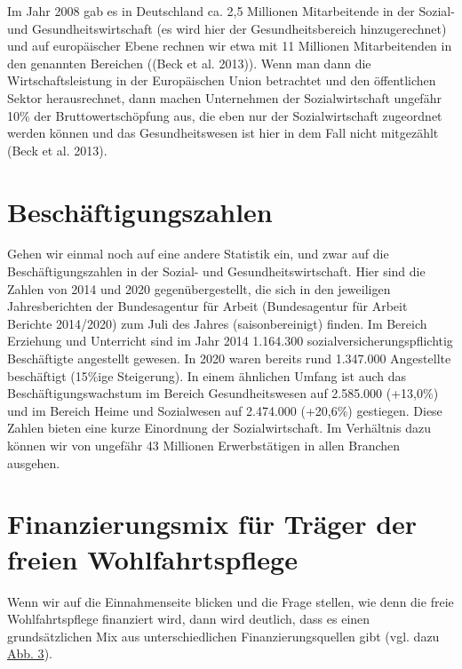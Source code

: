 \documentclass[
  letterpaper,
]{book}
\begin{document}
Im Jahr 2008 gab es in Deutschland ca. 2,5 Millionen Mitarbeitende in
der Sozial- und Gesundheitswirtschaft (es wird hier der
Gesundheitsbereich hinzugerechnet) und auf europäischer Ebene rechnen
wir etwa mit 11 Millionen Mitarbeitenden in den genannten Bereichen
((Beck et al. 2013)). Wenn man dann die Wirtschaftsleistung in der
Europäischen Union betrachtet und den öffentlichen Sektor herausrechnet,
dann machen Unternehmen der Sozialwirtschaft ungefähr 10\% der
Bruttowertschöpfung aus, die eben nur der Sozialwirtschaft zugeordnet
werden können und das Gesundheitswesen ist hier in dem Fall nicht
mitgezählt (Beck et al. 2013).

\section{Beschäftigungszahlen}\label{beschaeftigungszahlen}

Gehen wir einmal noch auf eine andere Statistik ein, und zwar auf die
Beschäftigungszahlen in der Sozial- und Gesundheitswirtschaft. Hier sind
die Zahlen von 2014 und 2020 gegenübergestellt, die sich in den
jeweiligen Jahresberichten der Bundesagentur für Arbeit (Bundesagentur
für Arbeit Berichte 2014/2020) zum Juli des Jahres (saisonbereinigt)
finden. Im Bereich Erziehung und Unterricht sind im Jahr 2014 1.164.300
sozialversicherungspflichtig Beschäftigte angestellt gewesen. In 2020
waren bereits rund 1.347.000 Angestellte beschäftigt (15\%ige
Steigerung). In einem ähnlichen Umfang ist auch das
Beschäftigungswachstum im Bereich Gesundheitswesen auf 2.585.000
(+13,0\%) und im Bereich Heime und Sozialwesen auf 2.474.000 (+20,6\%)
gestiegen. Diese Zahlen bieten eine kurze Einordnung der
Sozialwirtschaft. Im Verhältnis dazu können wir von ungefähr 43
Millionen Erwerbstätigen in allen Branchen ausgehen.

\section{Finanzierungsmix für Träger der freien
Wohlfahrtspflege}\label{finanzierungsmix}

Wenn wir auf die Einnahmenseite blicken und die Frage stellen, wie denn
die freie Wohlfahrtspflege finanziert wird, dann wird deutlich, dass es
einen grundsätzlichen Mix aus unterschiedlichen Finanzierungsquellen
gibt (vgl. dazu \hyperref[figure3]{Abb. 3}).
\end{document}
